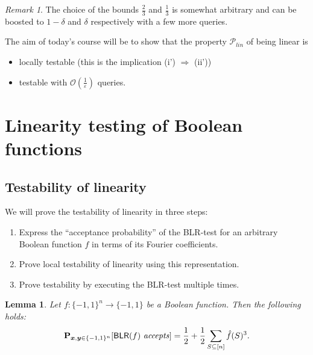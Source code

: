 \documentclass[a4paper]{article}
\newcommand{\prob}{\mathbf{P}}
\newcommand{\prty}{\mathcal{P}}
\newcommand{\nset}{[n]}
\newcommand{\eps}{\varepsilon}
\newcommand{\boldx}{\boldsymbol{x}}
\newcommand{\boldy}{\boldsymbol{y}}
\theoremstyle{plain}
\newtheorem{lemma}{Lemma}
\theoremstyle{definition}
\theoremstyle{remark}
\newtheorem*{remark*}{Remark}
\begin{document}
\begin{remark*}
  The choice of the bounds \(\frac{2}{3}\) and \(\frac{1}{3}\) is
  somewhat arbitrary and can be boosted to \(1-\delta\) and \(\delta\)
  respectively with a few more queries. 
\end{remark*}

\noindent The aim of today's course will be to show that the property
\(\prty_{lin}\) of being linear is 
\begin{itemize}
\item locally testable (this is the implication (i') \(\Rightarrow\)
  (ii'))
\item testable with \(\mathcal{O}\left(\frac{1}{\eps}\right)\)
  queries. 
\end{itemize}


\section{Linearity testing of Boolean functions}
\label{sec:line-test-bool}

\subsection{Testability of linearity}
\label{sec:test-line}

We will prove the testability of linearity in three steps: 
\begin{enumerate}
\item Express the ``acceptance probability'' of the \textsf{BLR}-test
  for an arbitrary Boolean function \(f\) in terms of its Fourier
  coefficients.
\item Prove local testability of linearity using this representation.
\item Prove testability by executing the \textsf{BLR}-test multiple
  times. 
\end{enumerate}

\begin{lemma} \label{lem:1}
  Let \(f: \{-1,1\}^n \rightarrow \{-1,1\}\) be a Boolean function. Then
  the following holds: 
  \begin{equation}
    \label{eq:2}
    \prob_{\boldx,\boldy \in \{-1,1\}^n}[\textsf{BLR}(f) \text{ \textit{accepts}}] = \frac{1}{2} + \frac{1}{2}\sum_{S\subseteq \nset}\hat{f}(S)^3.
  \end{equation}
\end{lemma}
\end{document}
